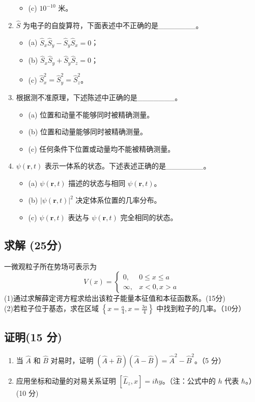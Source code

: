 \begin{enumerate}
\begin{itemize}
    \item (c) $10^{-10}$ 米。
\end{itemize}
    \item $\hat{S}$ 为电子的自旋算符，下面表述中不正确的是_______。  
    \begin{itemize}
    \item (a) $\hat{S}_x \hat{S}_y - \hat{S}_y \hat{S}_x = 0$；
    \item (b) $\hat{S}_x \hat{S}_y + \hat{S}_y \hat{S}_z = 0$；
    \item (c) $\hat{S}_x^2 = \hat{S}_y^2 = \hat{S}_z^2$。
\end{itemize}
    \item 根据测不准原理，下述陈述中正确的是_______。 
    \begin{itemize}
    \item (a) 位置和动量不能够同时被精确测量。
    \item (b) 位置和动量能够同时被精确测量。
    \item (c) 任何条件下位置或动量均不能被精确测量。
\end{itemize}
    \item $\psi(\mathbf{r}, t)$ 表示一体系的状态。下述表述正确的是_______。
    \begin{itemize}
    \item (a) $\psi(\mathbf{r}, t)$ 描述的状态与相同 $\psi(\mathbf{r}, t)$。
    \item (b) $|\psi(\mathbf{r}, t)|^2$ 决定体系位置的几率分布。
    \item (c) $\psi(\mathbf{r}, t)$ 表达与 $\psi(\mathbf{r}, t)$ 完全相同的状态。
\end{itemize}
\end{enumerate}
\subsection{求解 (25分)}
一微观粒子所在势场可表示为
\[
V(x) = 
\begin{cases} 
0, & 0 \leq x \leq a \\
\infty, & x < 0 , x > a
\end{cases}~
\]
(1)通过求解薛定谔方程求给出该粒子能量本征值和本征函数系。(15分)\\
(2)若粒子位于基态，求在区域 $\left\{x = \frac{a}{4}, x = \frac{3a}{4}\right\}$ 中找到粒子的几率。（10分）
\subsection{证明(15 分)}
\begin{enumerate}
    \item 当 $\hat{A}$ 和 $\hat{B}$ 对易时，证明 $ (\hat{A} + \hat{B})(\hat{A} - \hat{B}) = \hat{A}^2 - \hat{B}^2$。（5 分）
    
    \item 应用坐标和动量的对易关系证明 $[\hat{L}_z, x] = i \hbar y$。（注：公式中的 $h$ 代表 $\hbar$。）(10 分)
\end{enumerate}